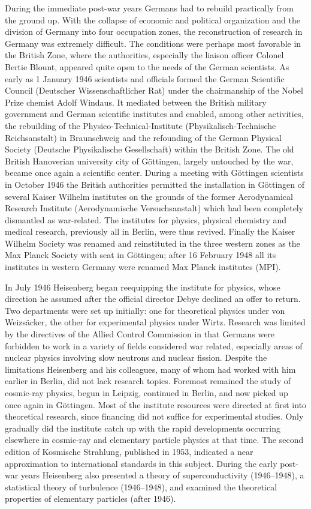 \documentclass{article}
\begin{document}
During the immediate post-war years Germans had to rebuild practically from the ground up. With the collapse of economic and political organization and the division of Germany into four occupation zones, the reconstruction of research in Germany was extremely difficult. The conditions were perhaps most favorable in the British Zone, where the authorities, especially the liaison officer Colonel Bertie Blount, appeared quite open to the needs of the German scientists. As early as 1 January 1946 scientists and officials formed the German Scientific Council (Deutscher Wissenschaftlicher Rat) under the chairmanship of the Nobel Prize chemist Adolf Windaus. It mediated between the British military government and German scientific institutes and enabled, among other activities, the rebuilding of the Physico-Technical-Institute (Physikalisch-Technische Reichsanstalt) in Braunschweig and the refounding of the German Physical Society (Deutsche Physikalische Gesellschaft) within the British Zone. The old British Hanoverian university city of Göttingen, largely untouched by the war, became once again a scientific center. During a meeting with Göttingen scientists in October 1946 the British authorities permitted the installation in Göttingen of several Kaiser Wilhelm institutes on the grounds of the former Aerodynamical Research Institute (Aerodynamische Versuchsanstalt) which had been completely dismantled as war-related. The institutes for physics, physical chemistry and medical research, previously all in Berlin, were thus revived. Finally the Kaiser Wilhelm Society was renamed and reinstituted in the three western zones as the Max Planck Society with seat in Göttingen; after 16 February 1948 all its institutes in western Germany were renamed Max Planck institutes (MPI).

In July 1946 Heisenberg began reequipping the institute for physics, whose direction he assumed after the official director Debye declined an offer to return. Two departments were set up initially: one for theoretical physics under von Weizsäcker, the other for experimental physics under Wirtz. Research was limited by the directives of the Allied Control Commission in that Germans were forbidden to work in a variety of fields considered war related, especially areas of nuclear physics involving slow neutrons and nuclear fission. Despite the limitations Heisenberg and his colleagues, many of whom had worked with him earlier in Berlin, did not lack research topics. Foremost remained the study of cosmic-ray physics, begun in Leipzig, continued in Berlin, and now picked up once again in Göttingen. Most of the institute resources were directed at first into theoretical research, since financing did not suffice for experimental studies. Only gradually did the institute catch up with the rapid developments occurring elsewhere in cosmic-ray and elementary particle physics at that time. The second edition of Kosmische Strahlung, published in 1953, indicated a near approximation to international standards in this subject. During the early post-war years Heisenberg also presented a theory of superconductivity (1946--1948), a statistical theory of turbulence (1946--1948), and examined the theoretical properties of elementary particles (after 1946).
\end{document}
